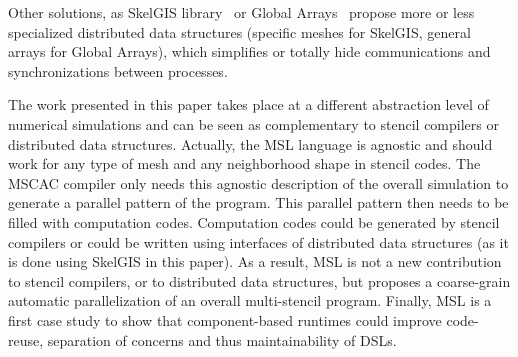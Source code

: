 Other solutions, as SkelGIS library~\cite{CPE:CPE3494} or Global Arrays~\cite{Nieplocha:2006:AAP:1125980.1125985} propose more or less specialized distributed data structures (specific meshes for SkelGIS, general arrays for Global Arrays), which simplifies or totally hide communications and synchronizations between processes.

The work presented in this paper takes place at a different abstraction level of numerical simulations and can be seen as complementary to stencil compilers or distributed data structures. Actually, the MSL language is agnostic and should work for any type of mesh and any neighborhood shape in stencil codes. The MSCAC compiler only needs this agnostic description of the overall simulation to generate a parallel pattern of the program. This parallel pattern then needs to be filled with computation codes.
Computation codes could be generated by stencil compilers or could be written using interfaces of distributed data structures (as it is done using SkelGIS in this paper). As a result, MSL is not a new contribution to stencil compilers, or to distributed data structures, but proposes a coarse-grain automatic parallelization of an overall multi-stencil program.
Finally, MSL is a first case study to show that component-based runtimes could improve code-reuse, separation of concerns and thus maintainability of DSLs. 




